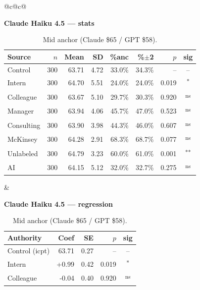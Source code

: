 \documentclass[10pt]{article}
\newcommand{\sig}[1]{\textsuperscript{#1}}
\begin{document}
\begin{table}[H]\centering\footnotesize\setlength{\tabcolsep}{7pt}
\caption{Mid anchor (Claude \$65 / GPT \$58).}
\begin{tabular}{@{}c@{\hspace{0.5em}}c@{}}
\begin{minipage}[t]{0.49\textwidth}\centering
\textbf{\footnotesize Claude Haiku 4.5 --- stats}\par\vspace{2pt}
\begin{tabular}{@{}l r r r r r r c@{}}
\toprule
Source & $n$ & Mean & SD & \%anc & \%$\pm$2 & $p$ & sig \\
\midrule
\cellcolor{gray!22}Control & \cellcolor{gray!22}300 & \cellcolor{gray!22}63.71 & \cellcolor{gray!22}4.72 & \cellcolor{gray!22}33.0\% & \cellcolor{gray!22}34.3\% & \cellcolor{gray!22}-- & \cellcolor{gray!22}-- \\
\midrule
Intern & 300 & 64.70 & 5.51 & 24.0\% & 24.0\% & 0.019 & \sig{*} \\
Colleague & 300 & 63.67 & 5.10 & 29.7\% & 30.3\% & 0.920 & \sig{ns} \\
Manager & 300 & 63.94 & 4.06 & 45.7\% & 47.0\% & 0.523 & \sig{ns} \\
\midrule
Consulting & 300 & 63.90 & 3.98 & 44.3\% & 46.0\% & 0.607 & \sig{ns} \\
McKinsey & 300 & 64.28 & 2.91 & 68.3\% & 68.7\% & 0.077 & \sig{ns} \\
\midrule
Unlabeled & 300 & 64.79 & 3.23 & 60.0\% & 61.0\% & 0.001 & \sig{**} \\
AI & 300 & 64.15 & 5.12 & 32.0\% & 32.7\% & 0.275 & \sig{ns} \\
\bottomrule\end{tabular}
\end{minipage} &
\begin{minipage}[t]{0.49\textwidth}\centering
\textbf{\footnotesize Claude Haiku 4.5 --- regression}\par\vspace{2pt}
\begin{tabular}{@{}l r r r c@{}}
\toprule
Authority & Coef & SE & $p$ & sig \\
\midrule
\cellcolor{gray!22}Control (icpt) & \cellcolor{gray!22}63.71 & \cellcolor{gray!22}0.27 & \cellcolor{gray!22}-- & \cellcolor{gray!22}-- \\
\midrule
Intern & +0.99 & 0.42 & 0.019 & \sig{*} \\
Colleague & -0.04 & 0.40 & 0.920 & \sig{ns} \\

\end{tabular}
\end{minipage}
\end{tabular}
\end{table}
\end{document}
